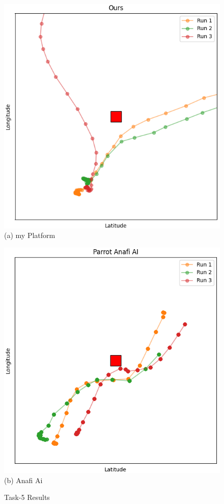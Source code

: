 \begin{figure}
\begin{minipage}[b]{0.495\linewidth}
\centering
\includegraphics[width=0.95\linewidth]{chapter4/FIGS/fig-obstacle-path-ours.png}
{(a) my Platform}
\end{minipage}
\begin{minipage}[b]{0.495\linewidth}
\centering
\includegraphics[width=0.95\linewidth]{chapter4/FIGS/fig-obstacle-path-anafiai.png}
{(b) Anafi Ai}
\end{minipage}
\caption{Task-5 Results}
\label{fig:obstacle-path}
\end{figure}

